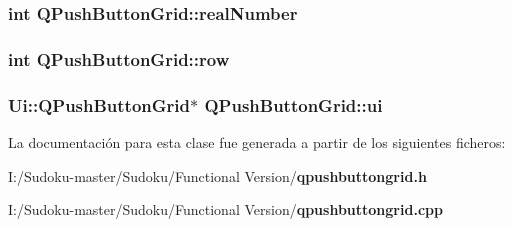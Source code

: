 \subsubsection[{real\-Number}]{\setlength{\rightskip}{0pt plus 5cm}int Q\-Push\-Button\-Grid\-::real\-Number}\label{class_q_push_button_grid_a659917a93c5ea84f8d6815a2380b687e}
\subsubsection[{row}]{\setlength{\rightskip}{0pt plus 5cm}int Q\-Push\-Button\-Grid\-::row}\label{class_q_push_button_grid_ad30c980cad65086f41840f69b5fb1e57}
\subsubsection[{ui}]{\setlength{\rightskip}{0pt plus 5cm}Ui\-::\-Q\-Push\-Button\-Grid$\ast$ Q\-Push\-Button\-Grid\-::ui\hspace{0.3cm}{\ttfamily [private]}}\label{class_q_push_button_grid_a73f52fa22fa7c71fa8401ad3890a9b86}


La documentación para esta clase fue generada a partir de los siguientes ficheros\-:\begin{DoxyCompactItemize}
\item 
I\-:/\-Sudoku-\/master/\-Sudoku/\-Functional Version/{\bf qpushbuttongrid.\-h}\item 
I\-:/\-Sudoku-\/master/\-Sudoku/\-Functional Version/{\bf qpushbuttongrid.\-cpp}\end{DoxyCompactItemize}
